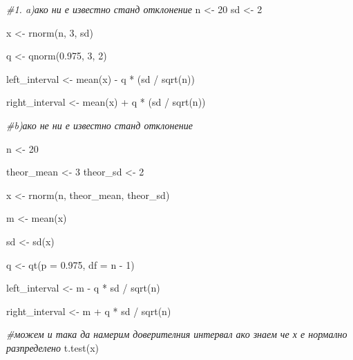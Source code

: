 \documentclass[
]{article}
\newenvironment{Shaded}{\begin{snugshade}}{\end{snugshade}}
\newcommand{\AttributeTok}[1]{\textcolor[rgb]{0.77,0.63,0.00}{#1}}
\newcommand{\CommentTok}[1]{\textcolor[rgb]{0.56,0.35,0.01}{\textit{#1}}}
\newcommand{\DecValTok}[1]{\textcolor[rgb]{0.00,0.00,0.81}{#1}}
\newcommand{\FloatTok}[1]{\textcolor[rgb]{0.00,0.00,0.81}{#1}}
\newcommand{\FunctionTok}[1]{\textcolor[rgb]{0.00,0.00,0.00}{#1}}
\newcommand{\NormalTok}[1]{#1}
\newcommand{\OtherTok}[1]{\textcolor[rgb]{0.56,0.35,0.01}{#1}}
\newcommand{\SpecialCharTok}[1]{\textcolor[rgb]{0.00,0.00,0.00}{#1}}
\begin{document}
\begin{Shaded}
\begin{Highlighting}[]
\CommentTok{\#1. a)ако ни е известно станд отклонение}
\NormalTok{n }\OtherTok{\textless{}{-}} \DecValTok{20}
\NormalTok{sd }\OtherTok{\textless{}{-}} \DecValTok{2}

\NormalTok{x }\OtherTok{\textless{}{-}} \FunctionTok{rnorm}\NormalTok{(n, }\DecValTok{3}\NormalTok{, sd)}

\NormalTok{q }\OtherTok{\textless{}{-}} \FunctionTok{qnorm}\NormalTok{(}\FloatTok{0.975}\NormalTok{, }\DecValTok{3}\NormalTok{, }\DecValTok{2}\NormalTok{)}

\NormalTok{left\_interval }\OtherTok{\textless{}{-}} \FunctionTok{mean}\NormalTok{(x) }\SpecialCharTok{{-}}\NormalTok{ q }\SpecialCharTok{*}\NormalTok{ (sd }\SpecialCharTok{/} \FunctionTok{sqrt}\NormalTok{(n))}

\NormalTok{right\_interval }\OtherTok{\textless{}{-}} \FunctionTok{mean}\NormalTok{(x) }\SpecialCharTok{+}\NormalTok{ q }\SpecialCharTok{*}\NormalTok{ (sd }\SpecialCharTok{/} \FunctionTok{sqrt}\NormalTok{(n))}

\CommentTok{\#b)ако не ни е известно станд отклонение}

\NormalTok{n }\OtherTok{\textless{}{-}} \DecValTok{20}

\NormalTok{theor\_mean }\OtherTok{\textless{}{-}} \DecValTok{3}
\NormalTok{theor\_sd }\OtherTok{\textless{}{-}} \DecValTok{2}

\NormalTok{x }\OtherTok{\textless{}{-}} \FunctionTok{rnorm}\NormalTok{(n, theor\_mean, theor\_sd)}

\NormalTok{m }\OtherTok{\textless{}{-}} \FunctionTok{mean}\NormalTok{(x)}

\NormalTok{sd }\OtherTok{\textless{}{-}} \FunctionTok{sd}\NormalTok{(x)}

\NormalTok{q }\OtherTok{\textless{}{-}} \FunctionTok{qt}\NormalTok{(}\AttributeTok{p =} \FloatTok{0.975}\NormalTok{, }\AttributeTok{df =}\NormalTok{ n }\SpecialCharTok{{-}} \DecValTok{1}\NormalTok{)}

\NormalTok{left\_interval }\OtherTok{\textless{}{-}}\NormalTok{ m }\SpecialCharTok{{-}}\NormalTok{ q }\SpecialCharTok{*}\NormalTok{ sd }\SpecialCharTok{/} \FunctionTok{sqrt}\NormalTok{(n)}

\NormalTok{right\_interval }\OtherTok{\textless{}{-}}\NormalTok{ m }\SpecialCharTok{+}\NormalTok{ q }\SpecialCharTok{*}\NormalTok{ sd }\SpecialCharTok{/} \FunctionTok{sqrt}\NormalTok{(n)}

\CommentTok{\#можем и така да намерим доверителния интервал ако знаем че х е нормално разпределено}
\FunctionTok{t.test}\NormalTok{(x)}
\end{Highlighting}
\end{Shaded}
\end{document}
